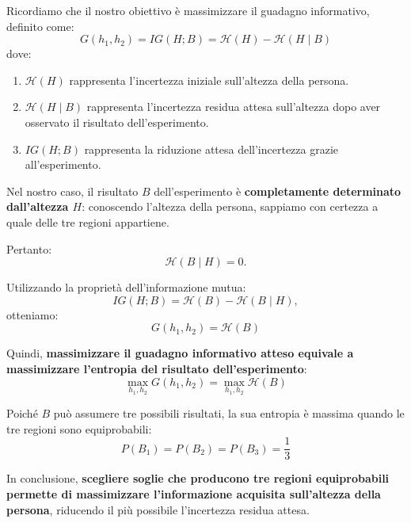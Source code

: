 Ricordiamo che il nostro obiettivo è massimizzare il guadagno
informativo, definito come:
\[
\boxed{
G(h_1,h_2)=IG(H;B)
=\mathcal{H}(H)-\mathcal{H}(H\mid B)
}
\]
dove:
\begin{enumerate}
    \item $\mathcal{H}(H)$ rappresenta l'incertezza iniziale
    sull'altezza della persona.
    \item $\mathcal{H}(H\mid B)$ rappresenta l'incertezza residua
    attesa sull'altezza dopo aver osservato il risultato
    dell'esperimento.
    \item $IG(H;B)$ rappresenta la riduzione attesa
    dell'incertezza grazie all'esperimento.
\end{enumerate}

Nel nostro caso, il risultato $B$ dell'esperimento è
\textbf{completamente determinato dall'altezza $H$}:
conoscendo l'altezza della persona, sappiamo con certezza
a quale delle tre regioni appartiene.

Pertanto:
\[
\mathcal{H}(B\mid H)=0.
\]

Utilizzando la proprietà dell'informazione mutua:
\[
IG(H;B)
=\mathcal{H}(B)-\mathcal{H}(B\mid H),
\]
otteniamo:
\[
\boxed{
G(h_1,h_2)=\mathcal{H}(B)
}
\]

Quindi, \textbf{massimizzare il guadagno informativo atteso
equivale a massimizzare l'entropia del risultato
dell'esperimento}:
\[
\boxed{
\max_{h_1,h_2}G(h_1,h_2)
=
\max_{h_1,h_2}\mathcal{H}(B)
}
\]

Poiché $B$ può assumere tre possibili risultati, la sua
entropia è massima quando le tre regioni sono equiprobabili:
\[
\boxed{
P(B_1)=P(B_2)=P(B_3)=\frac{1}{3}
}
\]

In conclusione, \textbf{scegliere soglie che producono tre
regioni equiprobabili permette di massimizzare
l'informazione acquisita sull'altezza della persona},
riducendo il più possibile l'incertezza residua attesa.

\newpage


